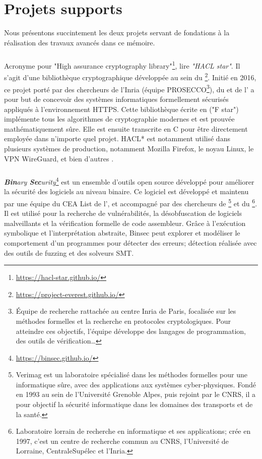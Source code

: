 \chapter*{Projets supports}
\label{chap:supports}

Nous présentons succintement les deux projets servant de fondations à la réalisation des travaux avancés dans ce mémoire.

\subsection*{}
Acronyme pour "High assurance cryptography library"\footnote{\url{https://hacl-star.github.io/}}, lire \textit{"HACL star"}. Il s'agit d'une bibliothèque cryptographique développée au sein du \textbf{}\footnote{\url{https://project-everest.github.io/}}. Initié en 2016, ce projet porté par des chercheurs de l'Inria (équipe PROSECCO\footnote{Équipe de recherche rattachée au centre Inria de Paris, focalisée sur les méthodes formelles et la recherche en protocoles cryptologiques. Pour atteindre ces objectifs, l'équipe développe des langages de programmation, des outils de vérification\dots}), du  et de l' a pour but de concevoir des systèmes informatiques formellement sécurisés appliqués à l'environnement HTTPS. Cette bibliothèque écrite en  ("F star") implémente tous les algorithmes de cryptographie modernes et est prouvée mathématiquement sûre. Elle est ensuite transcrite en C pour être directement employée dans n'importe quel projet. HACL* est notamment utilisé dans plusieurs systèmes de production, notamment Mozilla Firefox, le noyau Linux, le VPN WireGuard, et bien d'autres \etc.


\subsection*{}
\textit{\textbf{Bin}ary \textbf{Sec}urity}\footnote{\url{https://binsec.github.io/}} est un ensemble d'outils open source développé pour améliorer la sécurité des logiciels au niveau binaire. Ce logiciel est développé et maintenu par une équipe du CEA List de l', et accompagné par des chercheurs de \footnote{Verimag est un laboratoire spécialisé dans les méthodes formelles pour une informatique sûre, avec des applications aux systèmes cyber-physiques. Fondé en 1993 au sein de l'Université Grenoble Alpes, puis rejoint par le CNRS, il a pour objectif la sécurité informatique dans les domaines des transports et de la santé.} et du \footnote{Laboratoire lorrain de recherche en informatique et ses applications; crée en 1997, c'est un centre de recherche commun au CNRS, l'Université de Lorraine, CentraleSupélec et l'Inria.}. Il est utilisé pour la recherche de vulnérabilités, la désobfuscation de logiciels malveillants et la vérification formelle de code assembleur. Grâce à l'exécution symbolique et l'interprétation abstraite, Binsec peut explorer et modéliser le comportement d'un programmes pour détecter des erreurs; détection réalisée avec des outils de fuzzing et des solveurs SMT.
